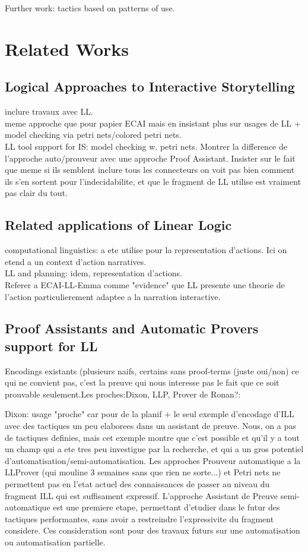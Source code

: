 \documentclass[runningheads,a4paper]{llncs}
\begin{document}
Further work: tactics based on patterns of use.
\section{Related Works}
\subsection{Logical Approaches to Interactive Storytelling}
inclure travaux avec LL.\\
meme approche que pour papier ECAI mais en insistant plus sur usages de LL + model checking via petri nets/colored petri nets.\\
LL tool support for IS: model checking w. petri nets. Montrer la difference de l'approche auto/prouveur avec une approche Proof Assistant. Insister sur le fait que meme si ils semblent inclure tous les connecteurs on voit pas bien comment ils s'en sortent pour l'indecidabilite, et que le fragment de LL utilise est vraiment pas clair du tout.
\subsection{Related applications of Linear Logic}
computational linguistics: a ete utilise pour la representation d'actions. Ici on etend a un context d'action narratives.\\
LL and planning: idem, representation d'actions.\\
Referer a ECAI-LL-Emma comme "evidence" que LL presente une theorie de l'action particulierement adaptee a la narration interactive.
\subsection{Proof Assistants and Automatic Provers support for LL}
Encodings existants (plusieurs naifs, certains sans proof-terms (juste oui/non) ce qui ne convient pas, c'est la preuve qui nous interesse pas le fait que ce soit prouvable seulement.Les proches:Dixon, LLP, Prover de Ronan?: 

Dixon: usage "proche" car pour de la planif + le seul exemple d'encodage d'ILL avec des tactiques un peu elaborees dans un assistant de preuve. Nous, on a pas de tactiques definies, mais cet exemple montre que c'est possible et qu'il y a tout un champ qui a ete tres peu investigue par la recherche, et qui a un gros potentiel d'automatisation/semi-automatisation. Les approches Prouveur automatique  a la LLProver (qui mouline 3 semaines sans que rien ne sorte...) et Petri nets ne permettent pas en l'etat actuel des connaissances de passer au niveau du fragment ILL qui est suffisament expressif. L'approche Assistant de Preuve semi-automatique est une premiere etape, permettant d'etudier dans le futur des tactiques performantes, sans avoir a restreindre l'expressivite du fragment considere. Ces consideration sont pour des travaux futurs sur une automatisation ou automatisation partielle.
\end{document}

